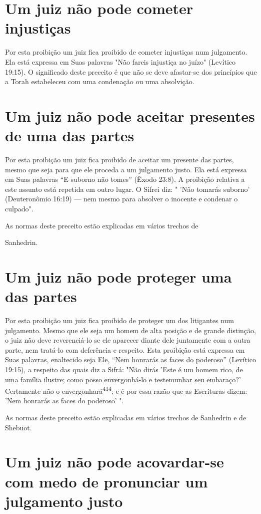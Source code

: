 \section{Um juiz não pode cometer injustiças}

Por esta proibição um juiz fica proibido de cometer injustiças num
julgamento. Ela está expressa em Suas palavras "Não fareis injustiça no
juízo" (Levítico 19:15). O significado deste preceito é que não se deve
afastar-se dos princípios que a Torah estabeleceu com uma condenação ou
uma absolvição.

\section{Um juiz não pode aceitar presentes de uma das partes}

Por esta proibição um juiz fica proibido de aceitar um presente das
partes, mesmo que seja para que ele proceda a um julgamento justo. Ela
está expressa em Suas palavras ``E suborno não tomes'' (Êxodo 23:8). A
proibição relativa a este assunto está repetida em outro lugar. O Sifrei
diz: " 'Não tomarás suborno' (Deuteronômio 16:19) --- nem mesmo para
absolver o inocente e con­denar o culpado".


As normas deste preceito estão explicadas em vários trechos de


Sanhedrin.

\section{Um juiz não pode proteger uma das partes}

Por esta proibição um juiz fica proibido de proteger um dos litigan­tes
num julgamento. Mesmo que ele seja um homem de alta posição e de gran­de
distinção, o juiz não deve reverenciá-lo se ele aparecer diante dele
junta­mente com a outra parte, nem tratá-lo com deferência e respeito.
Esta proibi­ção está expressa em Suas palavras, enaltecido seja Ele,
``Nem honrarás as faces do poderoso'' (Levítico 19:15), a respeito das
quais diz a Sifrá: "Não dirás 'Este é um homem rico, de uma família
ilustre; como posso envergonhá-lo e teste­munhar seu embaraço?'
Certamente não o envergonhará\textsuperscript{414}; e é por essa razão
que as Escrituras dizem: 'Nem honrarás as faces do poderoso' ".

As normas deste preceito estão explicadas em vários trechos de
Sa­nhedrin e de Shebuot.

\section{Um juiz não pode acovardar-se com medo de pronunciar um julgamento justo}

